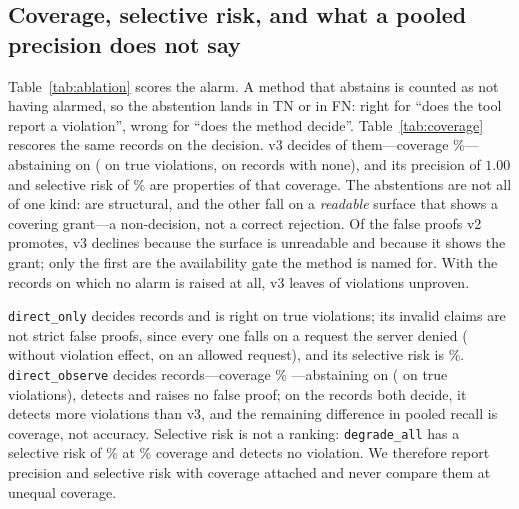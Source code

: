\subsection{Coverage, selective risk, and what a pooled precision does not say}
\label{sec:coverage}

Table~\ref{tab:ablation} scores the alarm. A method that abstains is counted as not
having alarmed, so the abstention lands in TN or in FN: right for ``does the tool report a
violation'', wrong for ``does the method decide''. Table~\ref{tab:coverage} rescores the
same \CvgN{} records on the decision. v3 decides \CvgVthreeDecided{} of them---coverage
\CvgVthreeCoveragePct{}\%---abstaining on \CvgVthreeAbstain{} (\CvgVthreeAbstBola{} on true
violations, \CvgVthreeAbstNormal{} on records with none), and its precision of $1.00$ and
selective risk of \CvgVthreeRiskPct{}\% are properties of that coverage. The abstentions are
not all of one kind: \CvgVthreeUnread{} are structural, and the other \CvgVthreeCover{} fall
on a \emph{readable} surface that shows a covering grant---a non-decision, not a correct
rejection. Of the \CvgVtwoFP{} false proofs v2 promotes, v3 declines \CvgVtwoFPUnread{}
because the surface is unreadable and \CvgVtwoFPCover{} because it shows the grant; only the
first are the availability gate the method is named for. With the \CvgVthreeMissed{} records
on which no alarm is raised at all, v3 leaves \CvgVthreeFNunproven{} of \CvgViolations{}
violations unproven.

\texttt{direct\_only} decides \CvgDirOnlyDecided{} records and is right on \CvgDirOnlyTP{}
true violations; its \CvgDirOnlyFP{} invalid claims are not strict false proofs, since every
one falls on a request the server denied (\CvgDirOnlyFpNoEffect{} without violation effect,
\CvgDirOnlyFpEffect{} on an allowed request), and its selective risk is \CvgDirOnlyRiskPct\%.
\texttt{direct\_observe} decides \CvgObsDecided{} records---coverage \CvgObsCoveragePct{}\%
---abstaining on \CvgObsAbstain{} (\CvgObsAbstBola{} on true violations), detects
\CvgObsDetected{} and raises no false proof; on the \CvgJointVthreeDirect{} records both
decide, it detects \CvgDetectGap{} more violations than v3, and the remaining difference in
pooled recall is coverage, not accuracy. Selective risk is not a ranking:
\texttt{degrade\_all} has a selective risk of \CvgDegradeRiskPct{}\% at
\CvgDegradeCoveragePct{}\% coverage and detects no violation. We therefore report precision
and selective risk with coverage attached and never compare them at unequal coverage.

